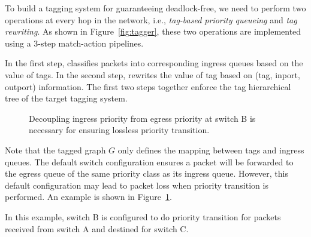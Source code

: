  To build a tagging system for guaranteeing deadlock-free, we need to perform two operations at every hop in the network, i.e.,  {\em tag-based priority queueing} and {\em tag rewriting}. As shown in Figure~\ref{fig:tagger}, these two operations are implemented using a 3-step match-action pipelines. 
 
 In the first step, \sysname{} classifies packets into corresponding ingress queues based on the value of tags. In the second step, \sysname{} rewrites the value of tag based on (tag, inport, outport) information. The first two steps together enforce the tag hierarchical tree of the target tagging system. 
 
 
  \begin{figure}[t]
 	\centering
 	
 	
 	
 	
 	\caption{Decoupling ingress priority from egress priority at switch B is necessary for ensuring lossless priority transition.}\label{fig:prioritydecoupling}
 	
 \end{figure}
 
 Note that the tagged graph $G$ only defines the mapping between tags and ingress queues. The default switch configuration ensures a packet will be forwarded to the egress queue of the same priority class as its ingress queue. However, this default configuration may lead to packet loss when priority transition is performed. An example is shown in Figure~\ref{fig:prioritydecoupling}. 
 
 In this example, switch B is configured to do priority transition for packets received from switch A and destined for switch C.
 
